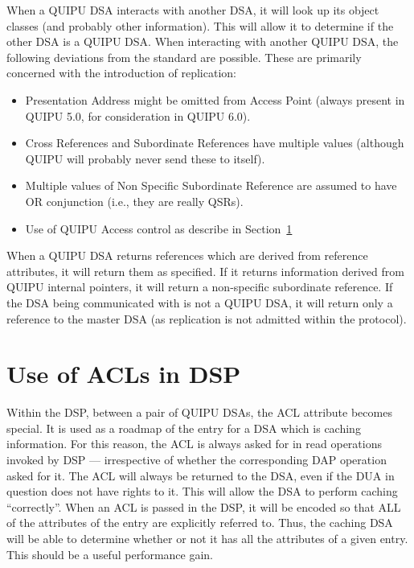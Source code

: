 When a QUIPU DSA interacts with another DSA, it will look up its object
classes (and probably other information).  This will allow it to determine if
the other DSA is a QUIPU DSA.  When interacting with another QUIPU DSA, the
following deviations from the standard are possible.  These are primarily
concerned with the introduction of replication:

\begin {itemize}
\item Presentation Address might be omitted from Access Point (always
present in QUIPU 5.0, for consideration in QUIPU 6.0).
\item Cross References and Subordinate References have multiple values
(although QUIPU will probably never send these to itself).
\item Multiple values of Non Specific Subordinate Reference are assumed to
have OR conjunction (i.e., they are really QSRs).
\item Use of QUIPU Access control as describe in Section~\ref{dsp-acl}
\end {itemize}

When a QUIPU DSA returns references which are derived from reference
attributes, it will return them as specified.  If it returns information
derived from QUIPU internal pointers, it will return a non-specific
subordinate reference.  If the DSA being communicated with is not a QUIPU
DSA, it will return only a reference to the master DSA (as replication is
not admitted within the protocol).

\section {Use of ACLs in DSP}
\label{dsp-acl}

Within the DSP, between a pair of QUIPU DSAs, the ACL
attribute becomes special.  It is used as a roadmap of the entry for
a DSA which is caching information.  For this reason, the ACL is
always asked for in read operations invoked by DSP --- irrespective
of whether the corresponding DAP operation asked for it.  The ACL
will always be returned to the DSA, even if the DUA in question does
not have rights to it.  This will allow the DSA to perform caching
``correctly''.  When an ACL is passed in the DSP, it will be encoded
so that ALL of the attributes of the entry are explicitly referred
to.  Thus, the caching DSA will be able to determine whether or not
it has all the attributes of a given entry.  This should be a useful
performance gain.

